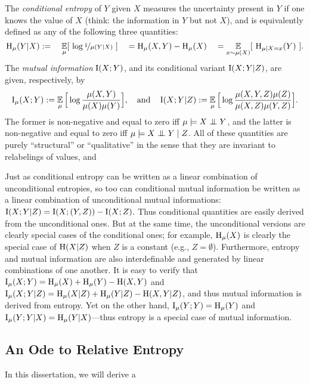 The \emph{conditional entropy} of $Y$ given $X$
measures the uncertainty present in $Y$ if one knows the value of $X$
(think: the information in $Y$ but not $X$),
and is equivalently defined as any of the following three quantities:
\[
\operatorname{\mathrm{H}}_\mu( Y | X) :=
        \quad
    \operatorname*{\mathbb{E}}_{\mu} [~\log \nicefrac1{\mu(Y | X)}~]
        \quad
    =\operatorname{\mathrm{H}}_\mu(X,Y) - \operatorname{\mathrm{H}}_\mu(X)
        \quad
    =\operatorname*{\mathbb{E}}_{x \sim \mu(X)} [~\operatorname{\mathrm{H}}_{\mu \mid X{=}x}(Y)~]    
.
\]
The \emph{mutual information} $\operatorname{\mathrm{I}}(X;Y)$,
and its conditional variant $\operatorname{\mathrm{I}}(X;Y|Z)$, 
are given, respectively, by
\[
    \operatorname{\mathrm{I}}_\mu(X;Y) :=
        \operatorname*{\mathbb{E}}_{\mu} \Big[ \log \frac{\mu(X,Y)}{\mu(X) \mu(Y)}\Big],
    \quad\text{and}\quad
    \operatorname{\mathrm{I}}(X;Y|Z):= 
        \operatorname*{\mathbb{E}}_{\mu} \Big[ \log \frac{\mu(X,Y,Z)\mu(Z)}{\mu(X,Z) \mu(Y,Z)}\Big].
\]
The former is non-negative and equal to zero iff $\mu \models X \mathrel{\perp\mspace{-10mu}\perp} Y$, and the latter is non-negative and equal to zero iff $\mu \models X \mathrel{\perp\mspace{-10mu}\perp} Y \mid Z$. 
All of these quantities are purely ``structural'' or ``qualitative'' in the sense that they are invariant to relabelings of values, and 

Just as conditional entropy can be written as a linear combination of unconditional entropies, so too can conditional mutual information be written as a linear combination of unconditional mutual informations: $\operatorname{\mathrm{I}}(X;Y|Z) = \operatorname{\mathrm{I}}(X;(Y,Z)) - \operatorname{\mathrm{I}}(X;Z)$.  
Thus conditional quantities are easily derived from the unconditional ones. But at the same time, the unconditional versions are clearly special cases of the conditional ones; for example, $\operatorname{\mathrm{H}}_\mu(X)$ is clearly the special case of $\operatorname{\mathrm{H}}(X|Z)$ when $Z$ is a constant (e.g., $Z = \emptyset$). 
Furthermore, entropy and mutual information are also interdefinable and generated by linear combinations of one another. 
It is easy to verify that 
$\operatorname{\mathrm{I}}_\mu(X;Y) 
    = \operatorname{\mathrm{H}}_\mu(X) + \operatorname{\mathrm{H}}_\mu(Y) - \operatorname{\mathrm{H}}(X,Y)
$
and 
$\operatorname{\mathrm{I}}_\mu(X;Y|Z)
    = \operatorname{\mathrm{H}}_\mu(X|Z) + \operatorname{\mathrm{H}}_\mu(Y|Z) - \operatorname{\mathrm{H}}(X,Y|Z)
$,
and thus mutual information is derived from entropy. 
Yet on the other hand, $\operatorname{\mathrm{I}}_\mu(Y;Y) = \operatorname{\mathrm{H}}_\mu(Y)$ and $\operatorname{\mathrm{I}}_\mu(Y;Y|X) = \operatorname{\mathrm{H}}_\mu(Y|X)$---thus entropy is a special case of mutual information. 


\subsection{An Ode to Relative Entropy}

In this dissertation, we will derive a 

